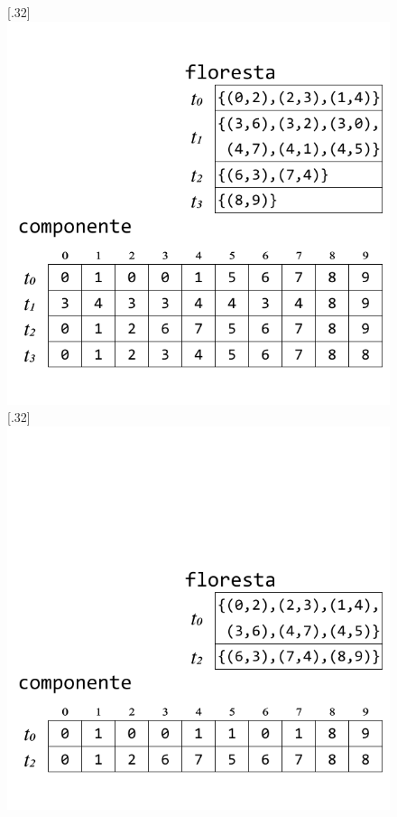 \documentclass[12pt]{article}
\begin{document}
\begin{figure}
{	}
	\subcaptionbox{}[.32\textwidth]
	{
		\includegraphics[width=\linewidth]{D.pdf}
	}
	\subcaptionbox{}[.32\textwidth]
	{
		\includegraphics[width=\linewidth]{E.pdf}
	}

\end{figure}
\end{document}
